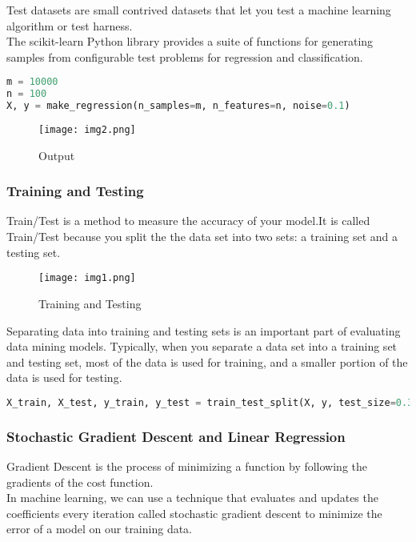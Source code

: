\documentclass[onecolumn]{article}
\begin{document}
Test datasets are small contrived datasets that let you test a machine learning algorithm or test harness.\\ The scikit-learn Python library provides a suite of functions for generating samples from configurable test problems for regression and classification.

\begin{lstlisting}[language=Python, caption=generate data] 
m = 10000
n = 100
X, y = make_regression(n_samples=m, n_features=n, noise=0.1)
\end{lstlisting} 

\begin{figure}[ht!]
\centering
\texttt{[image: img2.png]}
\caption{Output \label{}}
\end{figure}

\subsubsection{Training and Testing}
\label{sec:2.0.2}
Train/Test is a method to measure the accuracy of your model.It is called Train/Test because you split the the data set into two sets: a training set and a testing set.\\
\begin{figure}[ht!]
\centering
\texttt{[image: img1.png]}
\caption{Training and Testing \label{}}
\end{figure}
Separating data into training and testing sets is an important part of evaluating data mining models. Typically, when you separate a data set into a training set and testing set, most of the data is used for training, and a smaller portion of the data is used for testing.

\begin{lstlisting}[language=Python, caption=train and test] 
X_train, X_test, y_train, y_test = train_test_split(X, y, test_size=0.33, random_state=42)
\end{lstlisting} 

\subsubsection{Stochastic Gradient Descent and Linear Regression}
\label{sec:2.0.3}
Gradient Descent is the process of minimizing a function by following the gradients of the cost function.\\
In machine learning, we can use a technique that evaluates and updates the coefficients every iteration called stochastic gradient descent to minimize the error of a model on our training data.
\end{document}
